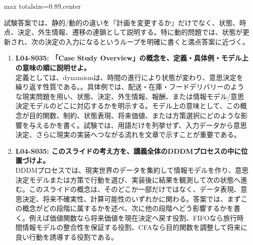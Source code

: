 \begin{minipage}[t]{0.58\textwidth}
\begin{adjustbox}{max totalsize={\textwidth}{0.89\textheight},center}
\begin{minipage}{\textwidth}
試験答案では、静的/動的の違いを『計画を変更するか』だけでなく、状態、時点、決定、外生情報、遷移の連鎖として説明する。特に動的問題では、状態が更新され、次の決定の入力になるというループを明確に書くと満点答案に近づく。\par{}\begin{enumerate}\item \textbf{L04-S035: 「Case Study Overview」の概念を、定義・具体例・モデル上の意味の順に説明せよ。}\\定義としては、dynamismは、時間の進行により状態が変わり、意思決定を繰り返す性質である。。具体例では、配送・在庫・フードデリバリーのような現実問題を用い、状態、決定、外生情報、報酬、または情報モデル/意思決定モデルのどこに対応するかを明示する。モデル上の意味として、この概念が目的関数、制約、状態表現、将来価値、または方策選択にどのような影響を与えるかを書く。試験では、用語だけを列挙せず、入力データから意思決定、さらに現実の実装へつながる流れを文章で示すことが重要である。\item \textbf{L04-S035: このスライドの考え方を、講義全体のDDDMプロセスの中に位置づけよ。}\\DDDMプロセスでは、現実世界のデータを集約して情報モデルを作り、意思決定モデルまたは方策で行動を選び、実装後に結果を観測して次の状態へ進む。このスライドの概念は、そのどこか一部だけではなく、データ表現、意思決定、将来不確実性、計算可能性のいずれかに関わる。答案では、まずこの概念がどの段階に属するかを述べ、次に他の段階へどう影響するかを書く。例えば価値関数なら将来価値を現在決定へ戻す役割、FIFOなら旅行時間情報モデルの整合性を保証する役割、CFAなら目的関数を調整して将来に良い行動を誘導する役割である。\end{enumerate}
\end{minipage}
\end{adjustbox}
\end{minipage}


